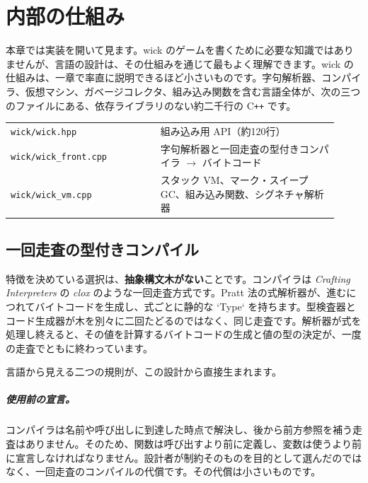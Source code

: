 \chapter{内部の仕組み}

本章では実装を開いて見ます。wick のゲームを書くために必要な知識ではありませんが、言語の設計は、その仕組みを通じて最もよく理解できます。wick の仕組みは、一章で率直に説明できるほど小さいものです。字句解析器、コンパイラ、仮想マシン、ガベージコレクタ、組み込み関数を含む言語全体が、次の三つのファイルにある、依存ライブラリのない約二千行の \mbox{C\texttt{++}} です。

\begin{center}
\begin{tabular}{@{}p{0.42\linewidth}p{0.50\linewidth}@{}}
\toprule
\texttt{wick/wick.hpp} & 組み込み用 API（約120行） \\
\texttt{wick/wick\_front.cpp} & 字句解析器と一回走査の型付きコンパイラ $\rightarrow$ バイトコード \\
\texttt{wick/wick\_vm.cpp} & スタック VM、マーク・スイープ GC、組み込み関数、シグネチャ解析器 \\
\bottomrule
\end{tabular}
\end{center}

\section{一回走査の型付きコンパイル}

特徴を決めている選択は、\textbf{抽象構文木がない}ことです。コンパイラは \emph{Crafting Interpreters} の \emph{clox} のような一回走査方式です。Pratt 法の式解析器が、進むにつれてバイトコードを生成し、式ごとに静的な `Type` を持ちます。型検査器とコード生成器が木を別々に二回たどるのではなく、同じ走査です。解析器が式を処理し終えると、その値を計算するバイトコードの生成と値の型の決定が、一度の走査でともに終わっています。

言語から見える二つの規則が、この設計から直接生まれます。

\paragraph{使用前の宣言。} コンパイラは名前や呼び出しに到達した時点で解決し、後から前方参照を補う走査はありません。そのため、関数は呼び出すより前に定義し、変数は使うより前に宣言しなければなりません。設計者が制約そのものを目的として選んだのではなく、一回走査のコンパイルの代償です。その代償は小さいものです。

